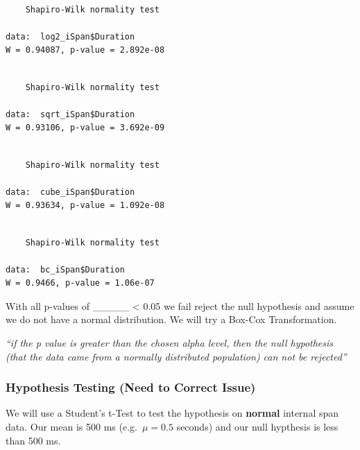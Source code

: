 \documentclass[
  letterpaper,
  DIV=11,
  numbers=noendperiod]{scrartcl}
\newenvironment{Shaded}{\begin{snugshade}}{\end{snugshade}}
\newcommand{\AttributeTok}[1]{\textcolor[rgb]{0.40,0.45,0.13}{#1}}
\newcommand{\DecValTok}[1]{\textcolor[rgb]{0.68,0.00,0.00}{#1}}
\newcommand{\FloatTok}[1]{\textcolor[rgb]{0.68,0.00,0.00}{#1}}
\newcommand{\FunctionTok}[1]{\textcolor[rgb]{0.28,0.35,0.67}{#1}}
\newcommand{\NormalTok}[1]{\textcolor[rgb]{0.00,0.23,0.31}{#1}}
\newcommand{\OtherTok}[1]{\textcolor[rgb]{0.00,0.23,0.31}{#1}}
\newcommand{\SpecialCharTok}[1]{\textcolor[rgb]{0.37,0.37,0.37}{#1}}
\newcommand{\StringTok}[1]{\textcolor[rgb]{0.13,0.47,0.30}{#1}}
\begin{document}
\begin{verbatim}

    Shapiro-Wilk normality test

data:  log2_iSpan$Duration
W = 0.94087, p-value = 2.892e-08
\end{verbatim}

\begin{verbatim}

    Shapiro-Wilk normality test

data:  sqrt_iSpan$Duration
W = 0.93106, p-value = 3.692e-09
\end{verbatim}

\begin{verbatim}

    Shapiro-Wilk normality test

data:  cube_iSpan$Duration
W = 0.93634, p-value = 1.092e-08
\end{verbatim}

\begin{verbatim}

    Shapiro-Wilk normality test

data:  bc_iSpan$Duration
W = 0.9466, p-value = 1.06e-07
\end{verbatim}

With all p-values of \_\_\_\_\_ \textless{} 0.05 we fail reject the null
hypothesis and assume we do not have a normal distribution. We will try
a Box-Cox Transformation.

\emph{``if the p value is greater than the chosen alpha level, then the
null hypothesis (that the data came from a normally distributed
population) can not be rejected''}

\hypertarget{hypothesis-testing-need-to-correct-issue}{%
\subsubsection{Hypothesis Testing (Need to Correct
Issue)}\label{hypothesis-testing-need-to-correct-issue}}

We will use a Student's t-Test to test the hypothesis on \textbf{normal}
internal span data. Our mean is 500 ms (e.g.~\(\mu = 0.5\) seconds) and
our null hypthesis is less than 500 ms.

\begin{Shaded}
\end{Shaded}
\end{document}
